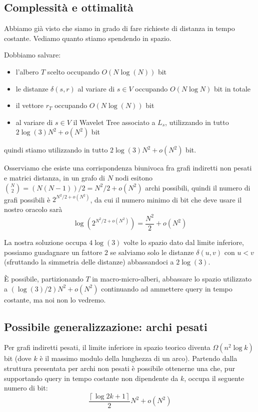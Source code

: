 \documentclass[a4paper,10pt]{amsbook}
\theoremstyle{plain}
\theoremstyle{definition}
\theoremstyle{remark}
\newcommand{\pa}[1]{\left(#1\right)}
\newcommand{\ceil}[1]{\left\lceil#1\right\rceil}
\begin{document}
\subsection{Complessit\`a e ottimalità}
\label{sec:oracoloesattoottimale}

Abbiamo gi\`a visto che siamo in grado di fare richieste di distanza
in tempo costante. Vediamo quanto stiamo spendendo in spazio.

Dobbiamo salvare:
\begin{itemize}
\item l'albero $T$ scelto occupando $O\pa{N\log\pa{N}}$ bit
\item le distanze $\delta\pa{s,r}$ al variare di $s\in V$ occupando
  $O\pa{ N \log N}$ bit in totale
\item il vettore $r_T$ occupando $O\pa{N \log\pa{N}}$ bit 
\item al variare di $s\in V$ il Wavelet Tree associato a $L_s$,
  utilizzando in tutto $2\log\pa{3} N^2 + o(N^2)$ bit
\end{itemize}
quindi stiamo utilizzando in tutto $2\log\pa{3} N^2 + o(N^2)$ bit.

Osserviamo che esiste una corrispondenza biunivoca fra grafi indiretti
non pesati e matrici distanza, in un grafo di $N$ nodi esitono
$\binom{N}{2} = \pa{N(N-1)}/{2} = N^2/2 + o(N^2)$ archi possibili,
quindi il numero di grafi possibili \`e $2^{N^2/2 + o(N^2)}$,
da cui il numero minimo di bit che deve usare il nostro oracolo sar\`a
\[ \log \pa{ 2^{N^2/2 + o(N^2)} } = \frac{N^2}{2} + o(N^2) \]

La nostra soluzione occupa $4 \log \pa{3}$ volte lo spazio dato dal
limite inferiore, possiamo guadagnare un fattore $2$ se salviamo solo
le distanze $\delta\pa{u,v}$ con $u<v$ (sfruttando la simmetria delle
distanze) abbassandoci a $2\log \pa{3}$.

\`E possibile, partizionando $T$ in macro-micro-alberi, abbassare lo
spazio utilizzato a $\pa{\log\pa{3} /2} N^2 + o(N^2)$ continuando ad
ammettere query in tempo costante, ma noi non lo vedremo.

\subsection{Possibile generalizzazione: archi pesati}

Per grafi indiretti pesati, il limite inferiore in spazio teorico
diventa $\Omega\pa{ n^2 \log k}$ bit (dove $k$ è il massimo modulo
della lunghezza di un arco). Partendo dalla struttura presentata per
archi non pesati \`e possibile ottenerne una che, pur supportando
query in tempo costante non dipendente da $k$, occupa il seguente
numero di bit:
\[ \frac{ \ceil { \log{2k+1} } }{2} N^2 + o(N^2) \]
\end{document}
